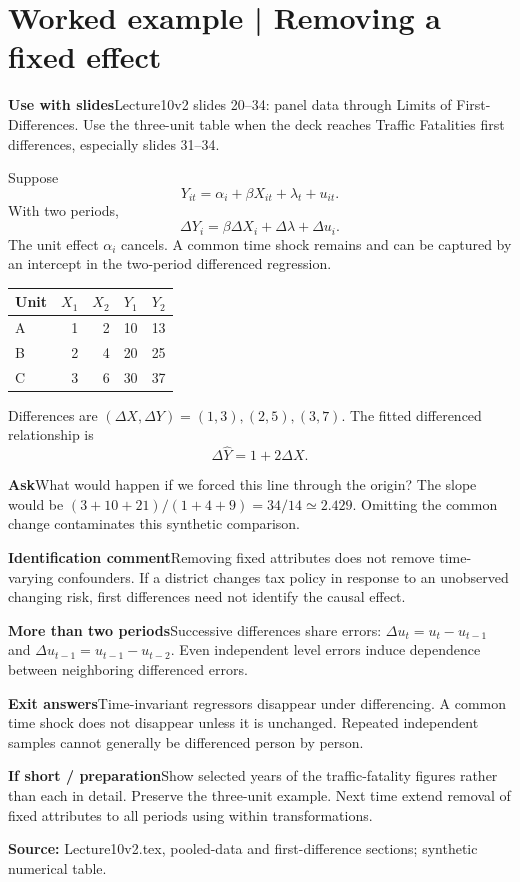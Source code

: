 \documentclass[11pt,a4paper]{article}
\newcommand{\heading}[1]{\section*{\color{accent}#1}}
\newcommand{\cue}[2]{\par\noindent\textbf{#1}\quad #2\par}
\begin{document}
\newpage
\heading{Worked example | Removing a fixed effect}
\cue{Use with slides}{Lecture10v2 slides 20--34: panel data through Limits of First-Differences. Use the three-unit table when the deck reaches Traffic Fatalities first differences, especially slides 31--34.}
Suppose
\[
Y_{it}=\alpha_i+\beta X_{it}+\lambda_t+u_{it}.
\]
With two periods,
\[
\Delta Y_i=\beta\Delta X_i+\Delta\lambda+\Delta u_i.
\]
The unit effect $\alpha_i$ cancels. A common time shock remains and can be captured by an intercept in the two-period differenced regression.
\begin{center}\begin{tabular}{lrrrr}\toprule
Unit & $X_1$ & $X_2$ & $Y_1$ & $Y_2$\\\midrule
A & 1 & 2 & 10 & 13\\
B & 2 & 4 & 20 & 25\\
C & 3 & 6 & 30 & 37\\\bottomrule
\end{tabular}\end{center}
Differences are $(\Delta X,\Delta Y)=(1,3),(2,5),(3,7)$. The fitted differenced relationship is
\[
\Delta\widehat Y=1+2\Delta X.
\]
\cue{Ask}{What would happen if we forced this line through the origin? The slope would be $(3+10+21)/(1+4+9)=34/14\simeq2.429$. Omitting the common change contaminates this synthetic comparison.}
\cue{Identification comment}{Removing fixed attributes does not remove time-varying confounders. If a district changes tax policy in response to an unobserved changing risk, first differences need not identify the causal effect.}
\cue{More than two periods}{Successive differences share errors: $\Delta u_t=u_t-u_{t-1}$ and $\Delta u_{t-1}=u_{t-1}-u_{t-2}$. Even independent level errors induce dependence between neighboring differenced errors.}
\cue{Exit answers}{Time-invariant regressors disappear under differencing. A common time shock does not disappear unless it is unchanged. Repeated independent samples cannot generally be differenced person by person.}
\cue{If short / preparation}{Show selected years of the traffic-fatality figures rather than each in detail. Preserve the three-unit example. Next time extend removal of fixed attributes to all periods using within transformations.}
\textbf{Source:} Lecture10v2.tex, pooled-data and first-difference sections; synthetic numerical table.
\end{document}
